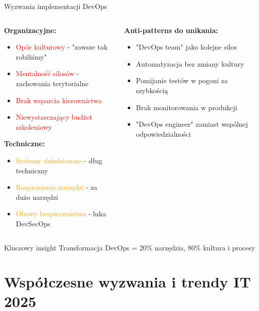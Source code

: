 \documentclass[10pt, aspectratio=169]{beamer}
\begin{document}
\begin{frame}{Wyzwania implementacji DevOps}
\begin{columns}[T]
\begin{column}{0.5\textwidth}
\textbf{Organizacyjne:}
\begin{itemize}
\item \textcolor{red}{Opór kulturowy} - "zawsze tak robiliśmy"
\item \textcolor{red}{Mentalność silosów} - zachowania terytorialne
\item \textcolor{red}{Brak wsparcia kierownictwa}
\item \textcolor{red}{Niewystarczający budżet szkoleniowy}
\end{itemize}

\textbf{Techniczne:}
\begin{itemize}
\item \textcolor{orange}{Systemy dziedziczone} - dług techniczny
\item \textcolor{orange}{Rozproszenie narzędzi} - za dużo narzędzi
\item \textcolor{orange}{Obawy bezpieczeństwa} - luka DevSecOps
\end{itemize}
\end{column}
\begin{column}{0.5\textwidth}
\textbf{Anti-patterns do unikania:}
\begin{itemize}
\item "DevOps team" jako kolejne silos
\item Automatyzacja bez zmiany kultury
\item Pomijanie testów w pogoni za szybkością
\item Brak monitorowania w produkcji
\item "DevOps engineer" zamiast wspólnej odpowiedzialności
\end{itemize}
\end{column}
\end{columns}

\begin{block}{Kluczowy insight}
Transformacja DevOps = 20\% narzędzia, 80\% kultura i procesy
\end{block}
\end{frame}

\section{Współczesne wyzwania i trendy IT 2025}
\end{document}
